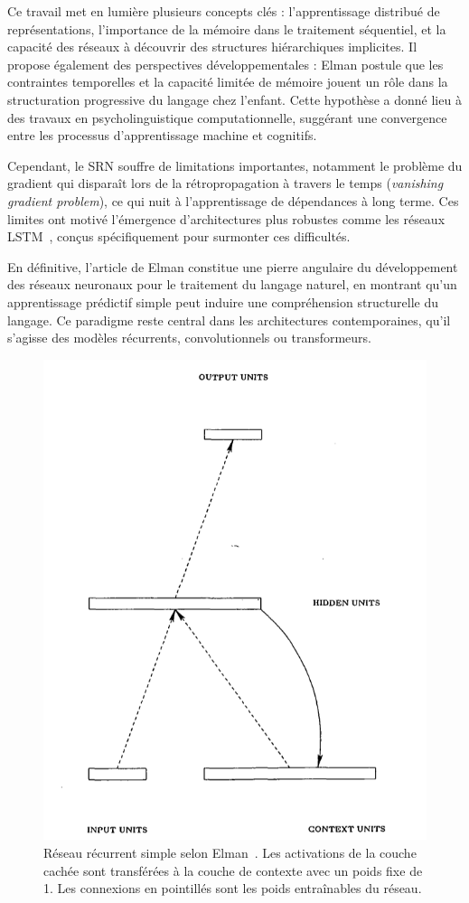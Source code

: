 \documentclass[12pt]{report}
\begin{document}
Ce travail met en lumière plusieurs concepts clés : l’apprentissage distribué de représentations, l’importance de la mémoire dans le traitement séquentiel, et la capacité des réseaux à découvrir des structures hiérarchiques implicites. Il propose également des perspectives développementales : Elman postule que les contraintes temporelles et la capacité limitée de mémoire jouent un rôle dans la structuration progressive du langage chez l’enfant. Cette hypothèse a donné lieu à des travaux en psycholinguistique computationnelle, suggérant une convergence entre les processus d’apprentissage machine et cognitifs.

Cependant, le SRN souffre de limitations importantes, notamment le problème du gradient qui disparaît lors de la rétropropagation à travers le temps (\textit{vanishing gradient problem}), ce qui nuit à l’apprentissage de dépendances à long terme. Ces limites ont motivé l’émergence d’architectures plus robustes comme les réseaux LSTM~\cite{hochreiter1997long}, conçus spécifiquement pour surmonter ces difficultés.

En définitive, l’article de Elman constitue une pierre angulaire du développement des réseaux neuronaux pour le traitement du langage naturel, en montrant qu’un apprentissage prédictif simple peut induire une compréhension structurelle du langage. Ce paradigme reste central dans les architectures contemporaines, qu’il s’agisse des modèles récurrents, convolutionnels ou transformeurs.

\begin{figure}[H]
\centering
\includegraphics[width=0.4\linewidth]{rnn_elman.png}
\caption{Réseau récurrent simple selon Elman~\cite{elman1990finding}. Les activations de la couche cachée sont transférées à la couche de contexte avec un poids fixe de 1. Les connexions en pointillés sont les poids entraînables du réseau.}
\label{fig:elman_rnn}
\end{figure}
\end{document}
